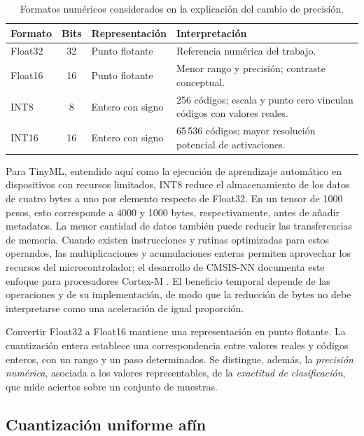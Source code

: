 \begin{table}[htbp]\centering\small
\caption{Formatos numéricos considerados en la explicación del cambio de precisión.}\label{tab:cap3_formatos}
\begin{tabularx}{\linewidth}{lclY}\toprule
Formato & Bits & Representación & Interpretación\\\midrule
Float32 & 32 & Punto flotante & Referencia numérica del trabajo.\\
Float16 & 16 & Punto flotante & Menor rango y precisión; contraste conceptual.\\
INT8 & 8 & Entero con signo & 256 códigos; escala y punto cero vinculan códigos con valores reales.\\
INT16 & 16 & Entero con signo & 65\,536 códigos; mayor resolución potencial de activaciones.\\\bottomrule
\end{tabularx}
\end{table}

Para TinyML, entendido aquí como la ejecución de aprendizaje automático en dispositivos con recursos limitados, INT8 reduce el almacenamiento de los datos de cuatro bytes a uno por elemento respecto de Float32. En un tensor de 1000 pesos, esto corresponde a 4000 y 1000 bytes, respectivamente, antes de añadir metadatos. La menor cantidad de datos también puede reducir las transferencias de memoria. Cuando existen instrucciones y rutinas optimizadas para estos operandos, las multiplicaciones y acumulaciones enteras permiten aprovechar los recursos del microcontrolador; el desarrollo de CMSIS-NN documenta este enfoque para procesadores Cortex-M \cite{lai2018}. El beneficio temporal depende de las operaciones y de su implementación, de modo que la reducción de bytes no debe interpretarse como una aceleración de igual proporción.

Convertir Float32 a Float16 mantiene una representación en punto flotante. La cuantización entera establece una correspondencia entre valores reales y códigos enteros, con un rango y un paso determinados. Se distingue, además, la \emph{precisión numérica}, asociada a los valores representables, de la \emph{exactitud de clasificación}, que mide aciertos sobre un conjunto de muestras.

\subsection{Cuantización uniforme afín}
